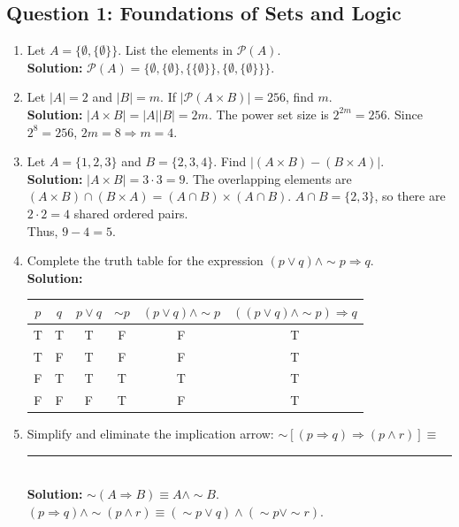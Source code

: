 \documentclass[11pt]{article}
\begin{document}
\subsection*{Question 1: Foundations of Sets and Logic}
\begin{enumerate}[label=(\roman*)]
    \item Let $A = \{\emptyset, \{\emptyset\}\}$. List the elements in $\mathcal{P}(A)$.\\
    \textbf{Solution:} $\mathcal{P}(A) = \{\emptyset, \{\emptyset\}, \{\{\emptyset\}\}, \{\emptyset, \{\emptyset\}\}\}$.

    \item Let $|A| = 2$ and $|B| = m$. If $|\mathcal{P}(A \times B)| = 256$, find $m$.\\
    \textbf{Solution:} $|A \times B| = |A||B| = 2m$. The power set size is $2^{2m} = 256$. Since $2^8 = 256$, $2m = 8 \Rightarrow m = 4$.

    \item Let $A = \{1, 2, 3\}$ and $B = \{2, 3, 4\}$. Find $|(A \times B) - (B \times A)|$.\\
    \textbf{Solution:} $|A \times B| = 3 \cdot 3 = 9$. The overlapping elements are $(A \times B) \cap (B \times A) = (A \cap B) \times (A \cap B)$. $A \cap B = \{2, 3\}$, so there are $2 \cdot 2 = 4$ shared ordered pairs. \\
    Thus, $9 - 4 = 5$.

    \item Complete the truth table for the expression $(p \vee q) \wedge \sim p \Rightarrow q$.\\
    \textbf{Solution:}
    \begin{center}
    \begin{tabular}{|c|c|c|c|c|c|}
    \hline
    $p$ & $q$ & $p \vee q$ & $\sim p$ & $(p \vee q) \wedge \sim p$ & $((p \vee q) \wedge \sim p) \Rightarrow q$ \\
    \hline
    T & T & T & F & F & T \\
    T & F & T & F & F & T \\
    F & T & T & T & T & T \\
    F & F & F & T & F & T \\
    \hline
    \end{tabular}
    \end{center}

    \item Simplify and eliminate the implication arrow: $\sim[(p \Rightarrow q) \Rightarrow (p \wedge r)] \equiv$ \rule{3cm}{0.15mm}\\
    \textbf{Solution:} $\sim(A \Rightarrow B) \equiv A \wedge \sim B$. \\
    $(p \Rightarrow q) \wedge \sim(p \wedge r) \equiv (\sim p \vee q) \wedge (\sim p \vee \sim r)$.


\end{enumerate}
\end{document}
